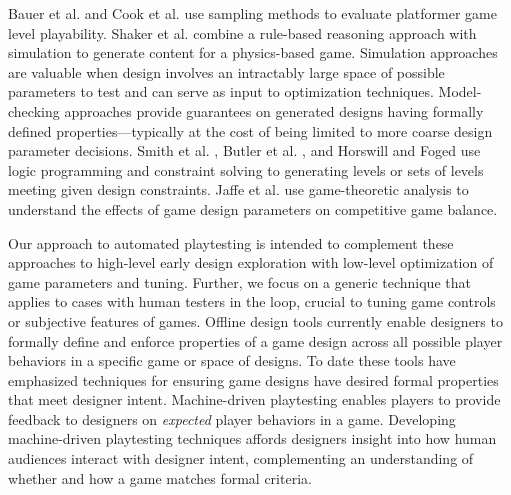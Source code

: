 \documentclass{sig-alternate}
\begin{document}
Bauer et al. \cite{bauer2013:rrt-generation} and Cook et al. \cite{cook2012:coopcoevo} use sampling methods to evaluate platformer game level playability.
Shaker et al. \cite{shaker2013:ropossum-test} combine a rule-based reasoning approach with simulation to generate content for a physics-based game.
Simulation approaches are valuable when design involves an intractably large space of possible parameters to test and can serve as input to optimization techniques.
%
Model-checking approaches provide guarantees on generated designs having formally defined properties---typically at the cost of being limited to more coarse design parameter decisions.
Smith et al. \cite{smith2013:quantify-play}, Butler et al. \cite{butler2013:progression-tool}, and Horswill and Foged \cite{horswill2012:levelgen} use logic programming and constraint solving to generating levels or sets of levels meeting given design constraints.
Jaffe et al. \cite{jaffe2012:balance} use game-theoretic analysis to understand the effects of game design parameters on competitive game balance.

Our approach to automated playtesting is intended to complement these approaches to high-level early design exploration with low-level optimization of game parameters and tuning.
Further, we focus on a generic technique that applies to cases with human testers in the loop, crucial to tuning game controls or subjective features of games.
%
Offline design tools currently enable designers to formally define and enforce properties of a game design across all possible player behaviors in a specific game or space of designs.
To date these tools have emphasized techniques for ensuring game designs have desired formal properties that meet designer intent.
%
Machine-driven playtesting enables players to provide feedback to designers on \textit{expected} player behaviors in a game.
Developing machine-driven playtesting techniques affords designers insight into how human audiences interact with designer intent, complementing an understanding of whether and how a game matches formal criteria.
\end{document}
